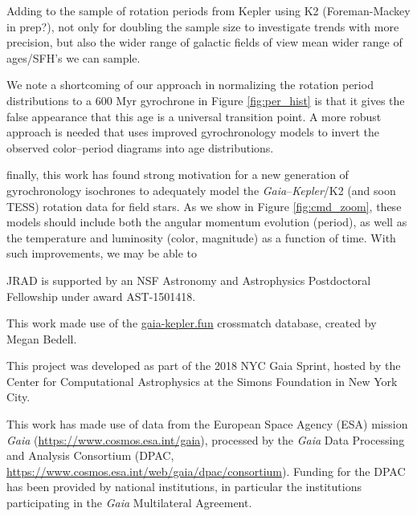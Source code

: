 \documentclass[preprint2]{aastex62}
\newcommand{\Kepler}{\textsl{Kepler}\xspace}
\begin{document}
Adding to the sample of rotation periods from Kepler using K2 (Foreman-Mackey in prep?), not only for doubling the sample size to investigate trends with more precision, but also the wider range of galactic fields of view mean wider range of ages/SFH's we can sample. 

We note a shortcoming of our approach in normalizing the rotation period distributions to a 600 Myr gyrochrone in Figure \ref{fig:per_hist} is that it gives the false appearance that this age is a universal transition point. A more robust approach is needed that uses improved gyrochronology models to invert the observed color--period diagrams into age distributions. 


finally, this work has found strong motivation for a new generation of gyrochronology isochrones to adequately model the {\em Gaia}--\Kepler/K2 (and soon TESS) rotation data for field stars. As we show in Figure \ref{fig:cmd_zoom}, these models should include both the angular momentum evolution (period), as well as the temperature and luminosity (color, magnitude) as a function of time. With such improvements, we may be able to 



\acknowledgments

JRAD is supported by an NSF Astronomy and Astrophysics Postdoctoral Fellowship under award AST-1501418. 

This work made use of the \url{gaia-kepler.fun} crossmatch database, created by Megan Bedell.

This project was developed as part of the 2018 NYC Gaia Sprint, hosted by the Center for Computational Astrophysics at the Simons Foundation in New York City.


This work has made use of data from the European Space Agency (ESA) mission
{\it Gaia} (\url{https://www.cosmos.esa.int/gaia}), processed by the {\it Gaia}
Data Processing and Analysis Consortium (DPAC,
\url{https://www.cosmos.esa.int/web/gaia/dpac/consortium}). Funding for the DPAC
has been provided by national institutions, in particular the institutions
participating in the {\it Gaia} Multilateral Agreement.




\end{document}
